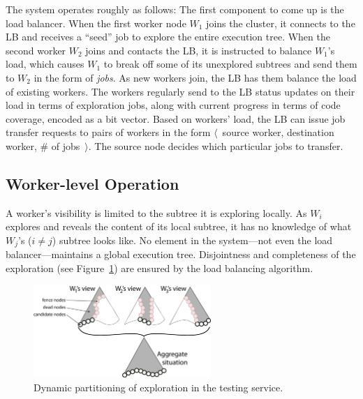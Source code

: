 The system operates roughly as follows: The first component to come up is the load balancer.  When the first worker node $W_1$ joins the cluster, it connects to the LB and receives a ``seed'' job to explore the entire execution tree.  When the second worker $W_2$ joins and contacts the LB, it is instructed to balance $W_1$'s load, which causes $W_1$ to break off some of its unexplored subtrees and send them to $W_2$ in the form of {\em jobs}.  As new workers join, the LB has them balance the load of existing workers.  The workers regularly send to the LB status updates on their load in terms of exploration jobs, along with current progress in terms of code coverage, encoded as a bit vector.  Based on workers' load, the LB can issue job transfer requests to pairs of workers in the form $\langle$~source worker, destination worker, \# of jobs~$\rangle$.  The source node decides which particular jobs to transfer.

\subsection{Worker-level Operation}
\label{sec:workerView}

A worker's visibility is limited to the subtree it is exploring locally.  As $W_i$ explores and reveals the content of its local subtree, it has no knowledge of what $W_j$'s ($i\ne j$) subtree looks like.  No element in the system---not even the load balancer---maintains a global execution tree.  Disjointness and completeness 
of the exploration (see Figure~\ref{fig:architecture}) are ensured by the load balancing algorithm.

\begin{figure}
  \centering
  \includegraphics[width=0.6\textwidth]{paas/figures/architecture-parsymbex}
  \caption{Dynamic partitioning of exploration in the testing service.}
 \label{fig:architecture}
\end{figure}

\newcommand{\dead}{dead\xspace}
\newcommand{\fence}{fence\xspace}
\newcommand{\candidate}{candidate\xspace}
\newcommand{\virtual}{virtual\xspace}
\newcommand{\materialized}{materialized\xspace}

